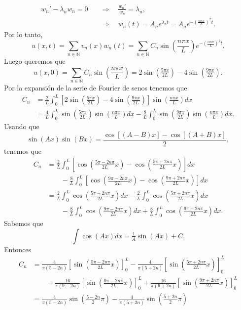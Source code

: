 \documentclass[12pt]{article}
\newcommand{\N}{\mathbb{N}}
\newcommand{\pp}[1]{\left( #1 \right)}
\newcommand{\cc}[1]{\left[ #1 \right]}
\newcommand{\Imp}{\quad\Longrightarrow\quad}
\renewcommand{\l}{\lambda}
\renewcommand{\a}{\alpha}
\begin{document}
\begin{enumerate}
\begin{enumerate}
\begin{align*}
                {w_n}'-\l_n w_n=0 &\Imp \frac{{w_n}'}{w_n} = \l_n,\\
                &\Imp w_n(t)= A_ne^{\l_nt} = A_ne^{-\pp{\frac{\a n\pi}{L}}^2t}.
            \end{align*}
            Por lo tanto,
            \[ u(x,t)=\sum_{n\in\N}v_n(x)w_n(t)=\sum_{n\in\N}C_n \sin\pp{\frac{n\pi x}{L}}e^{-\pp{\frac{\a n\pi}{L}}^2t}.\]
            Luego queremos que 
            \[ u(x,0)=\sum_{n\in\N}C_n \sin\pp{\frac{n\pi x}{L}}=2\sin\pp{\tfrac{5\pi x}{2L}}-4\sin\pp{\tfrac{9\pi x}{2L}}.\]
            Por la expansión de la serie de Fourier de senos tenemos que
            \begin{align*}
                C_n &= \frac{2}{L}\int_0^L\cc{2\sin\pp{\tfrac{5\pi x}{2L}}-4\sin\pp{\tfrac{9\pi x}{2L}}}\sin\pp{\tfrac{n\pi x}{L}}dx\\
                &= \frac{4}{L}\int_0^L\sin\pp{\tfrac{5\pi x}{2L}}\sin\pp{\tfrac{n\pi x}{L}}dx-\frac{8}{L}\int_0^L\sin\pp{\tfrac{9\pi x}{2L}}\sin\pp{\tfrac{n\pi x}{L}}dx.
            \end{align*}
            Usando que
            \[ \sin(Ax)\sin(Bx)=\frac{\cos[(A-B)x]-\cos[(A+B)x]}{2}, \]
            tenemos que
            \begin{align*}
                C_n &= \frac{2}{L}\int_0^L\cc{\cos\pp{\tfrac{5\pi-2n\pi}{2L}x}-\cos\pp{\tfrac{5\pi+2n\pi}{2L}x}}dx\\
                &\qquad-\frac{8}{L}\int_0^L\cc{\cos\pp{\tfrac{9\pi-2n\pi}{2L}x}-\cos\pp{\tfrac{9\pi+2n\pi}{2L}x}}dx\\
                &= \frac{2}{L}\int_0^L\cos\pp{\tfrac{5\pi-2n\pi}{2L}x}dx-\frac{2}{L}\int_0^L\cos\pp{\tfrac{5\pi+2n\pi}{2L}x}dx\\
                &\qquad-\frac{8}{L}\int_0^L\cos\pp{\tfrac{9\pi-2n\pi}{2L}x}dx+\frac{8}{L}\int_0^L\cos\pp{\tfrac{9\pi+2n\pi}{2L}x}dx.
            \end{align*}
            Sabemos que
            \[ \int\cos(Ax)dx=\tfrac{1}{A}\sin(Ax)+C. \]
            Entonces
            \begin{align*}
                C_n &= \frac{4}{\pi(5-2n)}\cc{\sin\pp{\tfrac{5\pi-2n\pi}{2L}x}}_0^L-\frac{4}{\pi(5+2n)}\cc{\sin\pp{\tfrac{5\pi+2n\pi}{2L}x}}_0^L\\
                &\qquad-\frac{16}{\pi(9-2n)}\cc{\sin\pp{\tfrac{9\pi-2n\pi}{2L}x}}_0^L+\frac{16}{\pi(9+2n)}\cc{\sin\pp{\tfrac{9\pi+2n\pi}{2L}x}}_0^L\\
                &= \frac{4}{\pi(5-2n)}\sin\pp{\tfrac{5-2n}{2}\pi}-\frac{4}{\pi(5+2n)}\sin\pp{\tfrac{5+2n}{2}\pi}\\

\end{align*}
\end{enumerate}
\end{enumerate}
\end{document}
